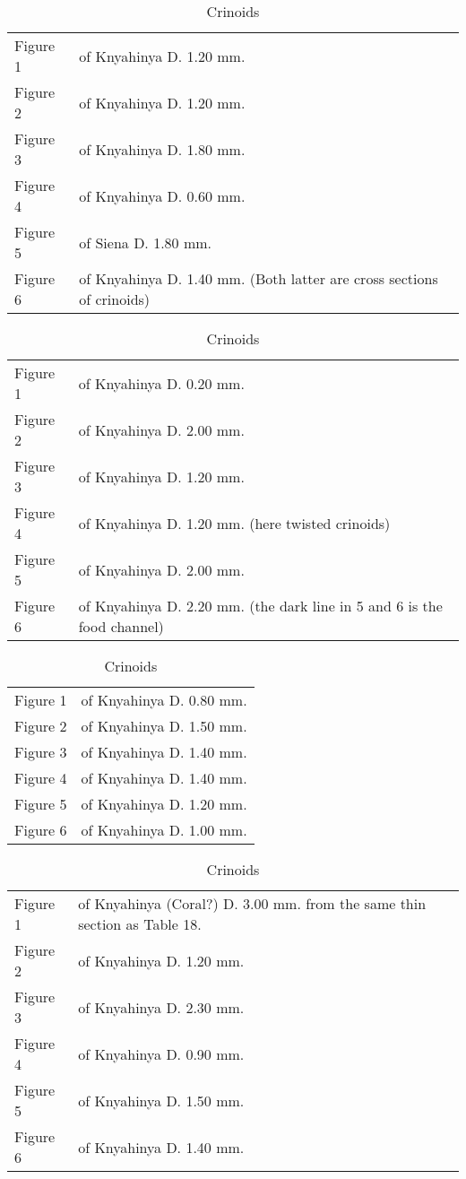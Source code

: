 \documentclass[a4paper, 12pt, oneside]{article}
\begin{document}
\begin{table}[ht!]
\caption{Crinoids}
\centering
\begin{tabular}{ p{2cm} p{10cm} }
\hline
 Figure 1 & of Knyahinya D. 1.20 mm. \\
 Figure 2 & of Knyahinya D. 1.20 mm. \\
 Figure 3 & of Knyahinya D. 1.80 mm. \\
 Figure 4 & of Knyahinya D. 0.60 mm. \\
 Figure 5 & of Siena D. 1.80 mm. \\
 Figure 6 & of Knyahinya D. 1.40 mm. (Both latter are cross sections of crinoids)
\end{tabular}
\label{table:25}
\end{table}
\begin{table}[ht!]
\caption{Crinoids}
\centering
\begin{tabular}{ p{2cm} p{10cm} }
\hline
 Figure 1 & of Knyahinya D. 0.20 mm. \\
 Figure 2 & of Knyahinya D. 2.00 mm. \\
 Figure 3 & of Knyahinya D. 1.20 mm. \\
 Figure 4 & of Knyahinya D. 1.20 mm. (here twisted crinoids) \\
 Figure 5 & of Knyahinya D. 2.00 mm. \\
 Figure 6 & of Knyahinya D. 2.20 mm. (the dark line in 5 and 6 is the food channel)
\end{tabular}
\label{table:26}
\end{table}
\begin{table}[ht!]
\caption{Crinoids}
\centering
\begin{tabular}{ p{2cm} p{10cm} }
\hline
 Figure 1 & of Knyahinya D. 0.80 mm. \\
 Figure 2 & of Knyahinya D. 1.50 mm. \\
 Figure 3 & of Knyahinya D. 1.40 mm. \\
 Figure 4 & of Knyahinya D. 1.40 mm. \\
 Figure 5 & of Knyahinya D. 1.20 mm. \\
 Figure 6 & of Knyahinya D. 1.00 mm.
\end{tabular}
\label{table:27}
\end{table}
\begin{table}[ht!]
\caption{Crinoids}
\centering
\begin{tabular}{ p{2cm} p{10cm} }
\hline
 Figure 1 & of Knyahinya (Coral?) D. 3.00 mm. from the same thin section as Table 18. \\
 Figure 2 & of Knyahinya D. 1.20 mm. \\
 Figure 3 & of Knyahinya D. 2.30 mm. \\
 Figure 4 & of Knyahinya D. 0.90 mm. \\
 Figure 5 & of Knyahinya D. 1.50 mm. \\
 Figure 6 & of Knyahinya D. 1.40 mm.
\end{tabular}
\label{table:28}
\end{table}
\end{document}
